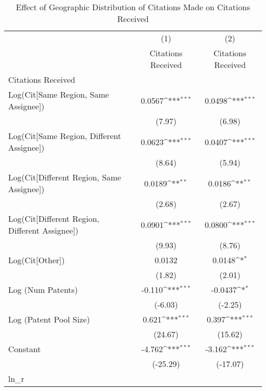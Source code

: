 {
\def\sym#1{\ifmmode^{#1}\else\(^{#1}\)\fi}
\begin{longtable}{l*{2}{c}}
\caption{Effect of Geographic Distribution of Citations Made on Citations Received \label{eflowsreg}}\\
\hline\hline\endfirsthead\hline\endhead\hline\endfoot\endlastfoot
                    &\multicolumn{1}{c}{(1)}&\multicolumn{1}{c}{(2)}\\
                    &\multicolumn{1}{c}{Citations Received}&\multicolumn{1}{c}{Citations Received}\\
\hline
Citations Received  &                     &                     \\
Log(Cit[Same Region, Same Assignee])&      0.0567\sym{***}&      0.0498\sym{***}\\
                    &      (7.97)         &      (6.98)         \\
[1em]
Log(Cit[Same Region, Different Assignee])&      0.0623\sym{***}&      0.0407\sym{***}\\
                    &      (8.64)         &      (5.94)         \\
[1em]
Log(Cit[Different Region, Same Assignee])&      0.0189\sym{**} &      0.0186\sym{**} \\
                    &      (2.68)         &      (2.67)         \\
[1em]
Log(Cit[Different Region, Different Assignee])&      0.0901\sym{***}&      0.0800\sym{***}\\
                    &      (9.93)         &      (8.76)         \\
[1em]
Log(Cit[Other])     &      0.0132         &      0.0148\sym{*}  \\
                    &      (1.82)         &      (2.01)         \\
[1em]
Log (Num Patents)   &      -0.110\sym{***}&     -0.0437\sym{*}  \\
                    &     (-6.03)         &     (-2.25)         \\
[1em]
Log (Patent Pool Size)&       0.621\sym{***}&       0.397\sym{***}\\
                    &     (24.67)         &     (15.62)         \\
[1em]
Constant            &      -4.762\sym{***}&      -3.162\sym{***}\\
                    &    (-25.29)         &    (-17.07)         \\
\hline
ln\_r                &                     &                     \\

\end{longtable}}
